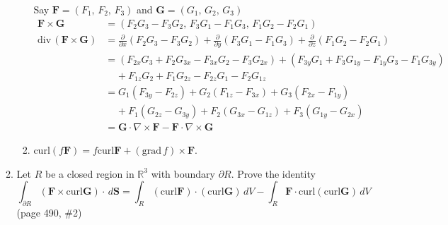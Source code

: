 \documentclass{article}
\newcommand{\parti}[1]{\frac{\partial}{\partial #1}}
\newcommand{\divt}{\text{div} \,}
\begin{document}
\begin{enumerate}
\begin{enumerate}
\begin{enumerate}[label=(\roman*)]
            Say $\boldsymbol F = (F_1,\, F_2,\, F_3)$ and 
            $\boldsymbol G = (G_1,\, G_2,\, G_3)$
            \begin{align*}
                \boldsymbol F \times \boldsymbol G 
                &= (F_2G_3 - F_3G_2,\, F_3G_1 - F_1G_3,\, F_1G_2 - F_2G_1) \\
                \divt ( \boldsymbol F \times \boldsymbol G)
                &= \parti{x}(F_2G_3 - F_3G_2) + \parti{y}(F_3G_1 - F_1G_3)
                + \parti{z}(F_1G_2 - F_2G_1) \\
                &= (F_{2x}G_3 + F_{2}G_{3x} - F_{3x}G_2- F_3G_{2x}) 
                + (F_{3y}G_1 + F_{3}G_{1y} - F_{1y}G_3- F_1G_{3y}) \\
                &\; \; \; \; + F_{1z}G_2 + F_1G_{2z} - F_{2z}G_1 - F_2G_{1z} \\
                &= G_1 (F_{3y} - F_{2z}) + G_2 (F_{1z} - F_{3x}) 
                + G_3 (F_{2x} - F_{1y}) \\
                &\; \; \; \; + F_1 (G_{2z} - G_{3y}) + F_2 (G_{3x} - G_{1z}) 
                + F_3 (G_{1y} - G_{2x}) \\
                &= \boldsymbol G \cdot \nabla \times \boldsymbol F
                - \boldsymbol F \cdot \nabla \times \boldsymbol G
            \end{align*} 
            \item curl$(f \boldsymbol F) 
            = f \text{curl} \boldsymbol F 
            + (\text{grad}\, f) \times \boldsymbol F$.
        \end{enumerate}
        \item Let $R$ be a closed region in $\mathbb{R}^3$ with boundary 
        $\partial R$. Prove the identity
        \[\int_{\partial R} ( \boldsymbol F \times \text{curl} \boldsymbol G) 
        \cdot \, d \boldsymbol S = 
        \int_R(\text{curl} \boldsymbol F ) 
        \cdot (\text{curl} \boldsymbol G) \, dV 
        - \int_R \boldsymbol F 
        \cdot \text{curl}(\text{curl} \boldsymbol G ) \, dV\]
        (page 490, \#2)
    \end{enumerate}
\end{enumerate}
\end{document}
